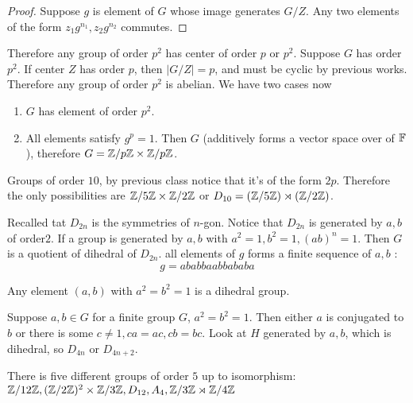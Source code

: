 \begin{proof}
	Suppose $g$ is element of $G$ whose image generates $G/Z$. Any two elements of the form $z_1g^{n_1}, z_2g^{n_2}$ commutes. 
\end{proof}
Therefore any group of order $p^2$ has center of order $p$ or $p^2$.  Suppose $G$ has order $p^2$. If center $Z$ has order $p$, then $|G/Z| = p$, and must be cyclic by previous works. Therefore any group of order $p^2$ is abelian. We have two cases now \begin{enumerate}
	\item $G$ has element of order $p^2$. 
	\item All elements satisfy $g^p = 1$. Then $G$ (additively forms a vector space over of $\mathbb F$), therefore $G = \mathbb Z/ p \mathbb Z \times \mathbb Z/ p \mathbb Z$.
\end{enumerate}
\begin{example}
	Groups of order $10$, by previous class notice that it's of the form $2p$. Therefore the only possibilities are $\mathbb Z/ 5 \mathbb Z \times \mathbb Z/ 2 \mathbb Z $ or $D_{10} = (\mathbb Z/ 5 \mathbb Z ) \rtimes (\mathbb Z/ 2 \mathbb Z )$.
\end{example}
Recalled tat $D_{2n}$ is the symmetries of $n$-gon.
Notice that $D_{2n}$ is generated by $a,b$ of order$2$. 
If a group is generated by $a,b$ with $a^2 = 1, b^2 = 1, (ab)^n = 1$. Then $G$ is a quotient of dihedral of $D_{2n}$. all elements of $g$ forms a finite sequence of $a,b$ :
\[ g = ababbaabbababa\]
\begin{proposition}
	Any element $(a,b)$ with $a^2 = b^2 = 1$ is a dihedral group.
\end{proposition}
\begin{corollary}
	Suppose $a,b \in G$ for a finite group $G$, $a^2 = b^2 = 1$. 
	Then either $a$ is conjugated to $b$ or there is some $c \neq 1, ca = ac, cb = bc$. 
	Look at $H$ generated by $a,b$, which is dihedral, so $D_{4n}$ or $D_{4n + 2}$.
\end{corollary}
\begin{theorem}
	There is five different groups of order $5$ up to isomorphism: $\mathbb Z/ 12 \mathbb Z, (\mathbb Z/ 2 \mathbb Z)^2 \times \mathbb Z/ 3 \mathbb Z, D_{12}, A_{4}, \mathbb Z/ 3 \mathbb Z \rtimes \mathbb Z/ 4 \mathbb Z $
\end{theorem}
